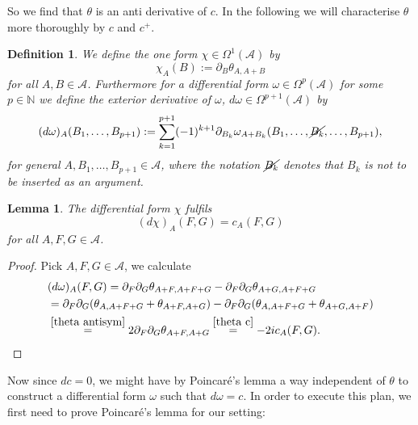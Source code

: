 \documentclass[a4paper,11pt]{article}
\newtheorem{de}{Definition}
\newtheorem{lem}{Lemma}
\begin{document}
So we find that \(\theta\) is an anti derivative of \(c\). In the following we will characterise \(\theta\) more thoroughly by \(c\) and \(c^+\).
\begin{de}
We define the one form \(\chi\in \Omega^1(\mathcal{A})\) by
\begin{equation}\label{de chi}
\chi_A(B):=\partial_B \theta_{A,A+B}
\end{equation}
for all \(A,B\in\mathcal{A}\).
Furthermore for a differential form \(\omega\in \Omega^p(\mathcal{A})\) for some \(p\in\mathbb{N}\) we define the exterior derivative of 
\(\omega\), \(d \omega\in\Omega^{p+1}(\mathcal{A})\) by
\begin{equation}
(d\omega)_A(B_1,\dots, B_{p+1}):=\sum_{k=1}^{p+1} (-1)^{k+1} \partial_{B_k}\omega_{A+B_k}(B_1,\dots , \cancel{B_k},\dots, B_{p+1}),
\end{equation}
for general \(A,B_1,\dots, B_{p+1}\in\mathcal{A}\), where the notation \(\cancel{B_k}\) denotes that \(B_k\) is not to be inserted as an argument.

\end{de}

\begin{lem}
The differential form \(\chi\) fulfils 
\begin{equation}
(d\chi)_A(F,G)=c_A(F,G)
\end{equation}
for all \(A,F,G\in\mathcal{A}\).
\end{lem}
\begin{proof}
Pick \(A,F,G\in \mathcal{A}\), we calculate
\begin{align}
&(d\omega)_A(F,G)=\partial_F\partial_G \theta_{A+F,A+F+G}-\partial_F \partial_G \theta_{A+G,A+F+G}\\
&=\partial_F\partial_G ( \theta_{A,A+F+G}+\theta_{A+F,A+G}) - \partial_F\partial_G(\theta_{A,A+F+G}+\theta_{A+G,A+F})\\
&\overset{\eqref{theta antisym}}{=} 2 \partial_F\partial_G\theta_{A+F,A+G}\overset{\eqref{theta c}}{=}-2i c_A(F,G).
\end{align}
\end{proof}

Now since \(d c=0\), we might have by Poincaré's lemma a way independent of \(\theta\) to construct a differential form \(\omega\) such that \(d\omega=c\). 
In order to execute this plan, we first need to prove Poincaré's lemma for our setting:
\end{document}
